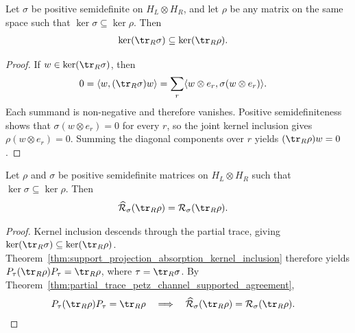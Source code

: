 \begin{theorem}
    \label{thm:partial_trace_kernel_inclusion}
    \leanok
    Let $\sigma$ be positive semidefinite on $H_L\otimes H_R$, and let $\rho$
    be any matrix on the same space such that
    $\ker\sigma\subseteq\ker\rho$. Then
    \begin{align}
        \ker(\tr_R\sigma)
        &\subseteq\ker(\tr_R\rho).
        \label{eq:entropy_partial_trace_kernel}
    \end{align}
\end{theorem}

\begin{proof}\leanok
    If $w\in\ker(\tr_R\sigma)$, then
    \begin{align}
        0
        &=\langle w,(\tr_R\sigma)w\rangle
          =\sum_r\langle w\otimes e_r,\sigma(w\otimes e_r)\rangle.
        \notag
    \end{align}
    Each summand is non-negative and therefore vanishes. Positive
    semidefiniteness shows that
    $\sigma(w\otimes e_r)=0$ for every $r$, so the joint kernel inclusion gives
    $\rho(w\otimes e_r)=0$. Summing the diagonal components over $r$ yields
    $(\tr_R\rho)w=0$.
\end{proof}

\begin{theorem}
    \label{thm:partial_trace_petz_channel_first_marginal_agreement}
    \leanok
    Let $\rho$ and $\sigma$ be positive semidefinite matrices on
    $H_L\otimes H_R$ such that $\ker\sigma\subseteq\ker\rho$. Then
    \begin{align}
        \widehat{\mathcal R}_\sigma(\tr_R\rho)
        &=\mathcal R_\sigma(\tr_R\rho).
        \label{eq:entropy_petz_marginal}
    \end{align}
\end{theorem}

\begin{proof}\leanok
    Kernel inclusion descends through the partial trace, giving
    $\ker(\tr_R\sigma)\subseteq\ker(\tr_R\rho)$.
    Theorem~\ref{thm:support_projection_absorption_kernel_inclusion} therefore
    yields $P_\tau(\tr_R\rho)P_\tau=\tr_R\rho$, where
    $\tau=\tr_R\sigma$. By
    Theorem~\ref{thm:partial_trace_petz_channel_supported_agreement},
    \begin{align}
        P_\tau(\tr_R\rho)P_\tau=\tr_R\rho
        \quad\Longrightarrow\quad
        \widehat{\mathcal R}_\sigma(\tr_R\rho)
        &=\mathcal R_\sigma(\tr_R\rho).
        \notag
    \end{align}
\end{proof}


